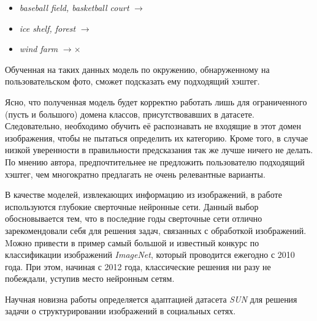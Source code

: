   \begin{itemize}
      \item \textit{baseball field, basketball court}  $\rightarrow$ 
      \item \textit{ice shelf, forest} $\rightarrow$ 
      \item \textit{wind farm} $\rightarrow \times$ 
  \end{itemize}
  
  
\indent
\indent
Обученная на таких данных модель по окружению,
обнаруженному на пользовательском фото,
сможет подсказать ему подходящий хэштег.



\indent
\indent
Ясно, что полученная модель будет корректно работать лишь для
ограниченного (пусть и большого) домена классов, присутствовавших 
в датасете. Следовательно, необходимо 
обучить её распознавать не входящие в этот домен изображения, чтобы
не пытаться определить их категорию. Кроме того, в случае низкой уверенности
в правильности предсказания так же лучше ничего не делать. 
По мнению автора, предпочтительнее не 
предложить пользователю подходящий хэштег, чем многократно предлагать 
не очень релевантные варианты.
 
   
\indent
\indent
В качестве моделей, извлекающих информацию из изображений,
в работе используются глубокие сверточные
нейронные сети. Данный выбор обосновывается тем, что в последние
годы сверточные сети отлично зарекомендовали себя для решения задач, связанных
с обработкой изображений. Mожно привести в пример самый большой 
и известный
конкурс по классификации изображений \textit{ImageNet}\cite{imagenet},
который проводится ежегодно с 2010 года. При этом, начиная с 2012 года, классические
решения ни разу не побеждали, уступив место нейронным сетям.


\indent
\indent
Научная новизна работы определяется адаптацией датасета \textit{SUN} для решения задачи о структурировании изображений в социальных сетях.
